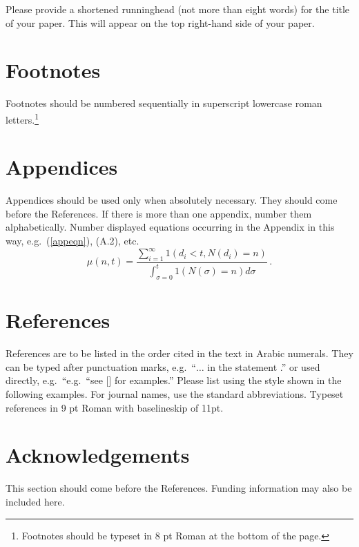 \documentclass{ws-ijsc}
\begin{document}
Please provide a shortened runninghead (not more than eight words) for
the title of your paper. This will appear on the top right-hand side
of your paper.

\section{Footnotes}

Footnotes should be numbered sequentially in superscript
lowercase roman letters.\footnote{Footnotes should be
typeset in 8 pt Roman at the bottom of the page.}

\appendix

\section{Appendices}

Appendices should be used only when absolutely necessary. They
should come before the References. If there is more than one
appendix, number them alphabetically. Number displayed equations
occurring in the Appendix in this way, e.g.~(\ref{appeqn}), (A.2),
etc.
\begin{equation}
\mu(n, t) = \frac{\sum^\infty_{i=1} 1(d_i < t, N(d_i) 
= n)}{\int^t_{\sigma=0} 1(N(\sigma) = n)d\sigma}\,.
\label{appeqn}
\end{equation}

\section*{References}
References are to be listed in the order cited in the text in Arabic 
numerals.  They can be typed after punctuation marks, 
e.g.~``$\ldots$ in the statement \cite{birk}.'' or used directly,
e.g.~``e.g.~``see [] for examples.'' Please list 
using the style shown in the following examples.  For journal names, 
use the standard abbreviations.  Typeset references in 9 pt Roman 
with baselineskip of 11pt.

\section*{Acknowledgements}

This section should come before the References. Funding
information may also be included here.
\end{document}
